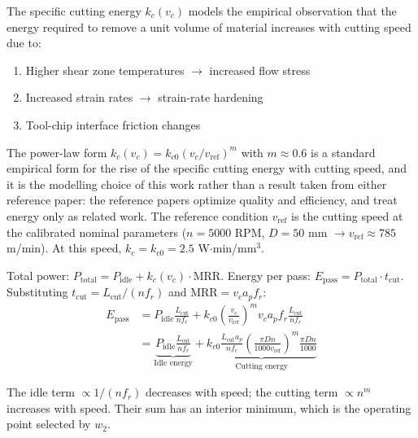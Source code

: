 \documentclass[11pt,a4paper]{article}
\newcommand{\MRR}{\mathrm{MRR}}
\begin{document}
The specific cutting energy $k_c(v_c)$ models the empirical observation that the energy required to remove a unit volume of material increases with cutting speed due to:
\begin{enumerate}
    \item Higher shear zone temperatures $\to$ increased flow stress
    \item Increased strain rates $\to$ strain-rate hardening
    \item Tool-chip interface friction changes
\end{enumerate}

The power-law form $k_c(v_c) = k_{c0} (v_c/v_\text{ref})^m$ with $m \approx 0.6$ is a standard empirical form for the rise of the specific cutting energy with cutting speed, and it is the modelling choice of this work rather than a result taken from either reference paper: the reference papers optimize quality and efficiency, and treat energy only as related work. The reference condition $v_\text{ref}$ is the cutting speed at the calibrated nominal parameters ($n=5000$ RPM, $D=50$ mm $\to v_\text{ref} \approx 785$ m/min). At this speed, $k_c = k_{c0} = 2.5$ W$\cdot$min/mm$^3$.

Total power: $P_\text{total} = P_\text{idle} + k_c(v_c) \cdot \MRR$.
Energy per pass: $E_\text{pass} = P_\text{total} \cdot t_\text{cut}$.
Substituting $t_\text{cut} = L_\text{cut} / (n f_r)$ and $\MRR = v_c a_p f_r$:
\begin{align}
    E_\text{pass} &= P_\text{idle} \frac{L_\text{cut}}{n f_r}
    + k_{c0} \left( \frac{v_c}{v_\text{ref}} \right)^m v_c a_p f_r \frac{L_\text{cut}}{n f_r} \\
    &= \underbrace{P_\text{idle} \frac{L_\text{cut}}{n f_r}}_\text{Idle energy}
    + \underbrace{k_{c0} \frac{L_\text{cut} a_p}{n f_r} \left( \frac{\pi D n}{1000 v_\text{ref}} \right)^m \frac{\pi D n}{1000}}_\text{Cutting energy}
\end{align}

The idle term $\propto 1/(n f_r)$ decreases with speed; the cutting term $\propto n^m$ increases with speed. Their sum has an interior minimum, which is the operating point selected by $w_2$.
\end{document}
